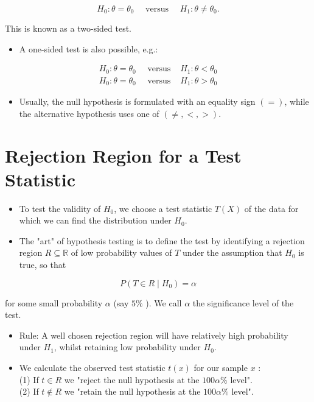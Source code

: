 \documentclass[10pt]{article}
\begin{document}
$$
H_{0}: \theta=\theta_{0} \quad \text { versus } \quad H_{1}: \theta \neq \theta_{0} .
$$

This is known as a two-sided test.

\begin{itemize}
  \item A one-sided test is also possible, e.g.:
\end{itemize}

$$
\begin{array}{lll}
H_{0}: \theta=\theta_{0} \quad \text { versus } & H_{1}: \theta<\theta_{0} \\
H_{0}: \theta=\theta_{0} \quad \text { versus } & H_{1}: \theta>\theta_{0}
\end{array}
$$

\begin{itemize}
  \item Usually, the null hypothesis is formulated with an equality sign $(=)$, while the alternative hypothesis uses one of $(\neq,<,>)$.
\end{itemize}

\section*{Rejection Region for a Test Statistic}
\begin{itemize}
  \item To test the validity of $H_{0}$, we choose a test statistic $T(X)$ of the data for which we can find the distribution under $H_{0}$.
  \item The "art" of hypothesis testing is to define the test by identifying a rejection region $R \subseteq \mathbb{R}$ of low probability values of $T$ under the assumption that $H_{0}$ is true, so that
\end{itemize}

$$
P\left(T \in R \mid H_{0}\right)=\alpha
$$

for some small probability $\alpha$ (say $5 \%$ ). We call $\alpha$ the significance level of the test.

\begin{itemize}
  \item Rule: A well chosen rejection region will have relatively high probability under $H_{1}$, whilst retaining low probability under $H_{0}$.
  \item We calculate the observed test statistic $t(x)$ for our sample $x$ :\\
(1) If $t \in R$ we "reject the null hypothesis at the $100 \alpha \%$ level".\\
(2) If $t \notin R$ we "retain the null hypothesis at the $100 \alpha \%$ level".
\end{itemize}
\end{document}
